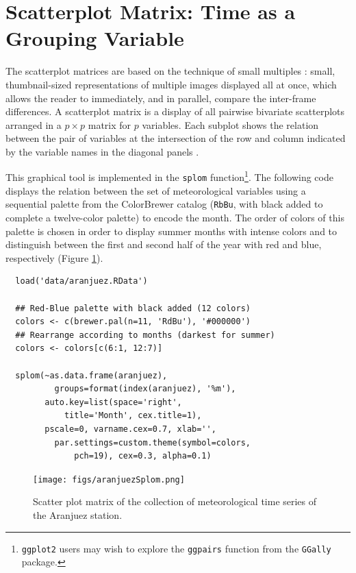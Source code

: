 
\section{Scatterplot Matrix: Time as a Grouping Variable}
\label{sec:orgheadline2}
\label{orgtarget1}

The scatterplot matrices are based on the technique of small multiples
\cite{Tufte1990}: small, thumbnail-sized representations of multiple
images displayed all at once, which allows the reader to immediately,
and in parallel, compare the inter-frame differences.  A scatterplot
matrix is a display of all pairwise bivariate scatterplots arranged in
a \(p \times p\) matrix for \(p\) variables. Each subplot shows the
relation between the pair of variables at the intersection of the row
and column indicated by the variable names in the diagonal panels
\cite{Friendly.Denis2005}.

This graphical tool is implemented in the \texttt{splom} function\footnote{\texttt{ggplot2} users may wish to explore the \texttt{ggpairs} function
from the \texttt{GGally} package.}. The
following code displays the relation between the set of
meteorological variables using a sequential palette from the
ColorBrewer catalog (\texttt{RbBu}, with black added to complete a
twelve-color palette) to encode the month. The order of colors of
this palette is chosen in order to display summer months with
intense colors and to distinguish between the first and second
half of the year with red and blue, respectively (Figure
\ref{fig:orgparagraph1}).


\lstset{language=R,label= ,caption= ,captionpos=b,numbers=none}
\begin{lstlisting}
  load('data/aranjuez.RData')
  
  ## Red-Blue palette with black added (12 colors)
  colors <- c(brewer.pal(n=11, 'RdBu'), '#000000')
  ## Rearrange according to months (darkest for summer)
  colors <- colors[c(6:1, 12:7)]
  
  splom(~as.data.frame(aranjuez),
          groups=format(index(aranjuez), '%m'),
        auto.key=list(space='right', 
            title='Month', cex.title=1),
        pscale=0, varname.cex=0.7, xlab='',
          par.settings=custom.theme(symbol=colors,
              pch=19), cex=0.3, alpha=0.1)
\end{lstlisting}

\begin{figure}[htb]
\centering
\texttt{[image: figs/aranjuezSplom.png]}
\caption{\label{fig:orgparagraph1}
Scatter plot matrix of the collection of meteorological time series of the Aranjuez station.}
\end{figure}



